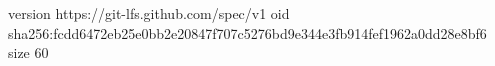 version https://git-lfs.github.com/spec/v1
oid sha256:fcdd6472eb25e0bb2e20847f707c5276bd9e344e3fb914fef1962a0dd28e8bf6
size 60

